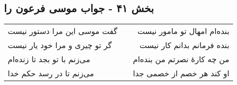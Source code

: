 \begin{center}
\section*{بخش ۴۱ - جواب موسی فرعون را}
\label{sec:sh041}
\begin{longtable}{l p{0.5cm} r}
گفت موسی این مرا دستور نیست
&&
بنده‌ام امهال تو مامور نیست
\\
گر تو چیری و مرا خود یار نیست
&&
بنده فرمانم بدانم کار نیست
\\
می‌زنم با تو بجد تا زنده‌ام
&&
من چه کارهٔ نصرتم من بنده‌ام
\\
می‌زنم تا در رسد حکم خدا
&&
او کند هر خصم از خصمی جدا
\\
\end{longtable}
\end{center}
